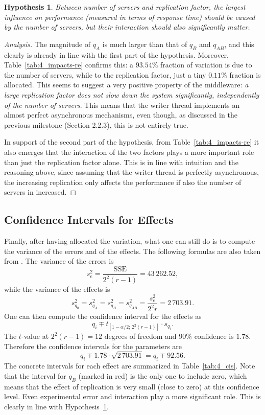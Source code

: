 \documentclass[11pt]{article}
\newtheorem{hyp}{Hypothesis}
\theoremstyle{definition}
\newenvironment{ana}[1][\proofname]{\begin{proof}[Analysis]}{\end{proof}}
\newcommand\re[1]{{\color[HTML]{ee1111}#1}}
\begin{document}
\begin{hyp}
    \label{hyp:4}
    Between number of servers and replication factor, the largest influence on performance (measured in terms of response time) should be caused by the number of servers, but their interaction should also significantly matter.
\end{hyp}
\begin{ana}
    The magnitude of $q_A$ is much larger than that of $q_B$ and $q_{AB}$, and this clearly is already in line with the first part of the hypothesis.
    Moreover, Table~\ref{tab:4_impacts-re} confirms this: a $93.54\%$ fraction of variation is due to the number of servers, while to the replication factor, just a tiny $0.11\%$ fraction is allocated.
    This seems to suggest a very positive property of the middleware: \emph{a large replication factor does not slow down the system significantly, independently of the number of servers}.
    This means that the writer thread implements an almost perfect asynchronous mechanisms, even though, as discussed in the previous milestone (Section 2.2.3), this is not entirely true.
    
    In support of the second part of the hypothesis, from Table~\ref{tab:4_impacts-re} it also emerges that the interaction of the two factors plays a more important role than just the replication factor alone.
    This is in line with intuition and the reasoning above, since assuming that the writer thread is perfectly asynchronous, the increasing replication only affects the performance if also the number of servers in increased. 
\end{ana}

\subsection{Confidence Intervals for Effects}

Finally, after having allocated the variation, what one can still do is to compute the variance of the errors and of the effects.
The following formulas are also taken from \cite{jain91}.
The variance of the errors is
\[s_e^2=\frac{\mathrm{SSE}}{2^2(r-1)}=43\,262.52,\]
while the variance of the effects is
\[s_{q_0}^2=s_{q_A}^2=s_{q_B}^2=s_{q_{AB}}^2=\frac{s_e^2}{2^2r}=2\,703.91.\]
One can then compute the confidence interval for the effects as
\[q_i\mp t_{[1-\alpha/2;\,2^2(r-1)]}\cdot s_{q_i}.\]
The $t$-value at $2^2(r-1)=12$ degrees of freedom and $90\%$ confidence is $1.78$.
Therefore the confidence intervals for the parameters are
\[q_i\mp1.78\cdot\sqrt{2\,703.91}=q_i\mp92.56.\]
The concrete intervals for each effect are summarized in Table~\ref{tab:4_cis}.
Note that the interval for $q_B$ (marked in \re{red}) is the only one to include zero, which means that the effect of replication is very small (close to zero) at this confidence level.
Even experimental error and interaction play a more significant role.
This is clearly in line with Hypothesis~\ref{hyp:4}.
\end{document}
